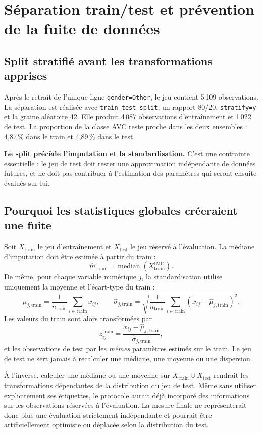 \section{Séparation train/test et prévention de la fuite de données}
\subsection{Split stratifié avant les transformations apprises}
Après le retrait de l'unique ligne \texttt{gender=Other}, le jeu contient 5\,109 observations. La séparation est réalisée avec \texttt{train\_test\_split}, un rapport 80/20, \texttt{stratify=y} et la graine aléatoire 42. Elle produit 4\,087 observations d'entraînement et 1\,022 de test. La proportion de la classe AVC reste proche dans les deux ensembles : 4,87\,\% dans le train et 4,89\,\% dans le test.

\textbf{Le split précède l'imputation et la standardisation.} C'est une contrainte essentielle : le jeu de test doit rester une approximation indépendante de données futures, et ne doit pas contribuer à l'estimation des paramètres qui seront ensuite évalués sur lui.

\subsection{Pourquoi les statistiques globales créeraient une fuite}
Soit \(X_{\mathrm{train}}\) le jeu d'entraînement et \(X_{\mathrm{test}}\) le jeu réservé à l'évaluation. La médiane d'imputation doit être estimée à partir du train :
\[
\widehat{m}_{\mathrm{train}}
= \operatorname{median}\!\left(X_{\mathrm{train}}^{\mathrm{IMC}}\right).
\]
De même, pour chaque variable numérique \(j\), la standardisation utilise uniquement la moyenne et l'écart-type du train :
\[
\widehat{\mu}_{j,\mathrm{train}}
= \frac{1}{n_{\mathrm{train}}}\sum_{i \in \mathrm{train}} x_{ij},
\qquad
\widehat{\sigma}_{j,\mathrm{train}}
= \sqrt{\frac{1}{n_{\mathrm{train}}}\sum_{i \in \mathrm{train}}
(x_{ij}-\widehat{\mu}_{j,\mathrm{train}})^2}.
\]
Les valeurs du train sont alors transformées par
\[
z_{ij}^{\mathrm{train}}
= \frac{x_{ij}-\widehat{\mu}_{j,\mathrm{train}}}
       {\widehat{\sigma}_{j,\mathrm{train}}},
\]
et les observations de test par les \emph{mêmes} paramètres estimés sur le train. Le jeu de test ne sert jamais à recalculer une médiane, une moyenne ou une dispersion.

À l'inverse, calculer une médiane ou une moyenne sur \(X_{\mathrm{train}}\cup X_{\mathrm{test}}\) rendrait les transformations dépendantes de la distribution du jeu de test. Même sans utiliser explicitement ses étiquettes, le protocole aurait déjà incorporé des informations sur les observations réservées à l'évaluation. La mesure finale ne représenterait donc plus une évaluation strictement indépendante et pourrait être artificiellement optimiste ou déplacée selon la distribution du test.

